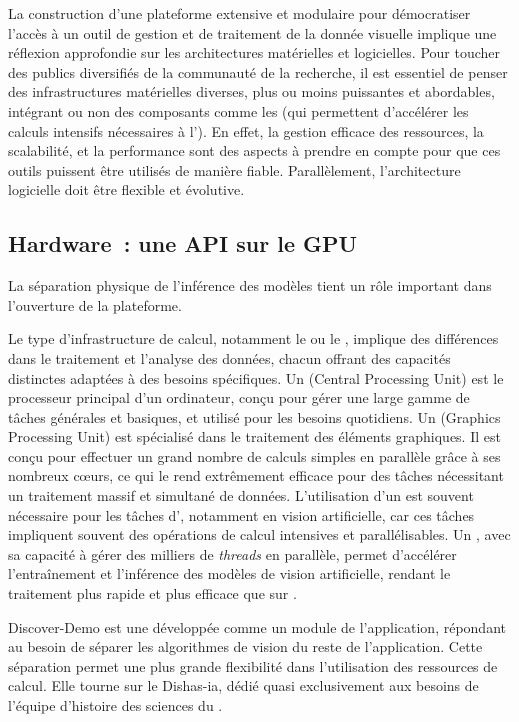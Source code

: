 La construction d'une plateforme extensive et modulaire pour
démocratiser l'accès à un outil de gestion et de traitement de la donnée
visuelle implique une réflexion approfondie sur les architectures
matérielles et logicielles. Pour toucher des publics diversifiés de la communauté de la recherche, il est
essentiel de penser des infrastructures matérielles diverses, plus ou
moins puissantes et abordables, intégrant ou non des composants comme
les \gpu (qui permettent d'accélérer les calculs intensifs nécessaires à
l'\ia). En effet, la gestion efficace des ressources, la scalabilité,
et la performance sont des aspects à prendre en compte pour
que ces outils puissent être utilisés de manière fiable. Parallèlement, l'architecture logicielle doit être flexible et
évolutive. 

\hypertarget{hardware-une-api-sur-le-gpu}{%
\subsection{Hardware~: une API sur le GPU}\label{hardware-une-api-sur-le-gpu}}

La séparation physique de l'inférence des modèles tient un rôle
important dans l'ouverture de la plateforme.

Le type d'infrastructure de calcul, notamment le \cpu ou le \gpu,
implique des différences dans le traitement et l'analyse des données,
chacun offrant des capacités distinctes adaptées à des besoins
spécifiques. Un \cpu (Central Processing Unit) est le processeur
principal d'un ordinateur, conçu pour gérer une large gamme de tâches
générales et basiques, et utilisé pour les besoins quotidiens. Un \gpu
(Graphics Processing Unit) est spécialisé dans le
traitement des éléments graphiques. Il est conçu pour effectuer un grand
nombre de calculs simples en parallèle grâce à ses nombreux cœurs, ce
qui le rend extrêmement efficace pour des tâches nécessitant un
traitement massif et simultané de données. L'utilisation d'un \gpu est
souvent nécessaire pour les tâches d'\ia, notamment en vision
artificielle, car ces tâches impliquent souvent des opérations de calcul
intensives et parallélisables. Un \gpu, avec sa capacité à gérer des
milliers de \textit{threads} en parallèle, permet d'accélérer l'entraînement
et l'inférence des modèles de vision artificielle, rendant le traitement
plus rapide et plus efficace que sur \cpu.

Discover-Demo est une \api développée comme un module de l'application, répondant au besoin de séparer les algorithmes de vision du reste
de l'application. Cette séparation permet une plus grande flexibilité
dans l'utilisation des ressources de calcul. Elle tourne sur le \gpu
Dishas-ia, dédié quasi exclusivement aux besoins de l'équipe d'histoire
des sciences du \syrte.

